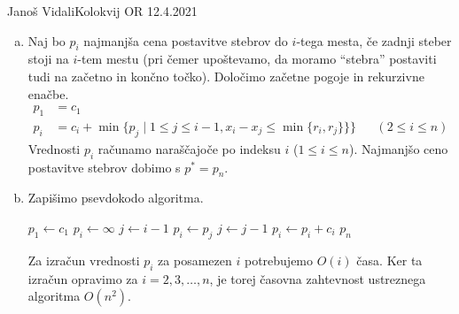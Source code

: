 \begin{naloga}{Janoš Vidali}{Kolokvij OR 12.4.2021}
\begin{odgovor}
\begin{enumerate}[(a)]
\item Naj bo $p_i$ najmanjša cena postavitve stebrov do $i$-tega mesta,
če zadnji steber stoji na $i$-tem mestu
(pri čemer upoštevamo,
da moramo ``stebra'' postaviti tudi na začetno in končno točko).
Določimo začetne pogoje in rekurzivne enačbe.
\begin{align*}
p_1 &= c_1 \\
p_i &= c_i + \min\{p_j \mid 1 \le j \le i-1, x_i - x_j \le \min\{r_i, r_j\}\}\} && (2 \le i \le n)
\end{align*}
Vrednosti $p_i$ računamo naraščajoče po indeksu $i$ ($1 \le i \le n$).
Najmanjšo ceno postavitve stebrov dobimo s $p^* = p_n$.

\item Zapišimo psevdokodo algoritma.
\begin{small}
\begin{algorithmic}
	\State $p_1 \gets c_1$
	    \State $p_i \gets \infty$
	    \State $j \gets i-1$
	            \State $p_i \gets p_j$
	        \EndIf
	        \State $j \gets j-1$
	    \EndWhile
	    \State $p_i \gets p_i + c_i$
	\EndFor
	\State \Return $p_n$
\EndFunction
\end{algorithmic}
\end{small}

Za izračun vrednosti $p_i$ za posamezen $i$
potrebujemo $O(i)$ časa.
Ker ta izračun opravimo za $i = 2, 3, \dots, n$,
je torej časovna zahtevnost ustreznega algoritma $O(n^2)$.


\end{enumerate}
\end{odgovor}
\end{naloga}
